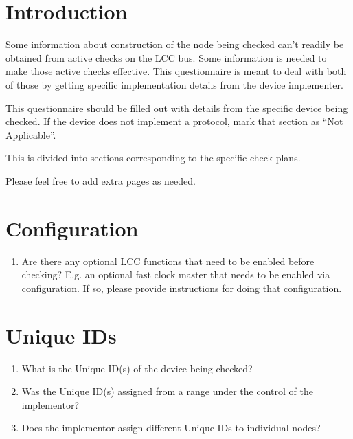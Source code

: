 



\maketitle
\thispagestyle{firststyle}

\section{Introduction}

Some information about construction of the node being checked can't readily be obtained
from active checks on the LCC bus. Some information is needed to make those active 
checks effective.  This questionnaire is meant to deal with both of those
by getting specific implementation details from the device implementer.

This questionnaire should be filled out with details from the specific device being checked.
If the device does not implement a protocol, mark that section as ``Not Applicable''.

This is divided into sections corresponding to the specific check plans.

Please feel free to add extra pages as needed.

\section{Configuration}
    \begin{enumerate}
    \item Are there any optional LCC functions that need to be enabled before checking?
            E.g. an optional fast clock master that needs to be enabled via configuration.
            If so, please provide instructions for doing that configuration.
    \end{enumerate}
    
\section{Unique IDs}
    \begin{enumerate}
        \item What is the Unique ID(s) of the device being checked?
        \item Was the Unique ID(s) assigned from a range under the control of the implementor? 
        \item Does the implementor assign different Unique IDs to individual nodes?
    \end{enumerate}

